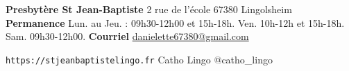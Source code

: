 \begin{framed}
\textbf{Presbytère St Jean-Baptiste}
2 rue de l'école 67380 Lingolsheim  \\
\textbf{Permanence} Lun. au Jeu. : 09h30-12h00 et 15h-18h. Ven. 10h-12h et 15h-18h. Sam. 09h30-12h00.
\textbf{Courriel} \href{mailto:danielette67380@gmail.com}{danielette67380@gmail.com}


\texttt{https://stjeanbaptistelingo.fr} \hfill \faFacebook Catho Lingo \hfill \faInstagram @catho\_lingo
\end{framed}

